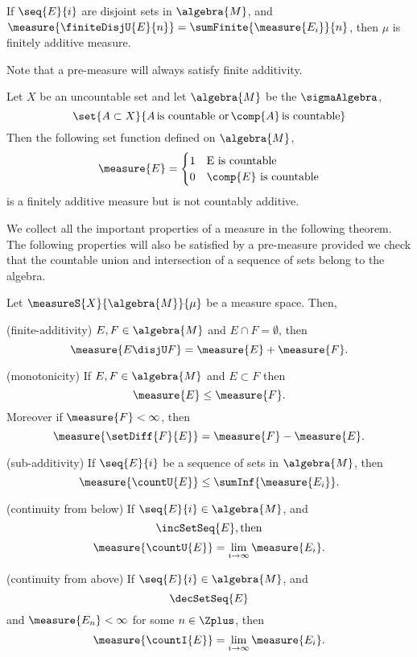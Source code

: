 \begin{Definition}[name=Finitely additive measure]
    If $\seq{E}{i}$ are disjoint sets in $\algebra{M}$, and $\measure{\finiteDisjU{E}{n}} =
    \sumFinite{\measure{E_i}}{n}$, then $\mu$ is finitely additive measure.
\end{Definition}
Note that a pre-measure will always satisfy finite additivity.
\begin{Example}
    Let $X$ be an uncountable set and let $\algebra{M}$ be the $\sigmaAlgebra$,
    \begin{equation*}
	\set{A \subset X}{A \, \text{is countable or} \,
	    \comp{A}\,\text{is countable}}
    \end{equation*}
    Then the following set function defined on $\algebra{M}$,
    \begin{equation*}
	\measure{E} =
	\begin{cases}
	    1 &\text{E is countable}\\
	    0 &\text{$\comp{E}$ is countable}
	\end{cases}
    \end{equation*}
    is a finitely additive measure but is not countably additive.
\end{Example}
We collect all the important properties of a measure in the following theorem. The following
properties will also be satisfied by a pre-measure provided we check that the countable union and
intersection of a sequence of sets belong to the algebra.
\begin{Theorem}[name=Properties of measure]\label{thm:prop_of_meas}
    Let $\measureS{X}{\algebra{M}}{\mu}$ be a measure space. Then,
    \begin{properties}
	\item 
	    (finite-additivity) $E,F \in \algebra{M}$ and $E \cap F = \emptyset$, then 
	    \[\measure{E\disjU F} = \measure{E} + \measure{F}.\]
	\item
	    (monotonicity) If $E,F \in \algebra{M}$ and $E \subset F$ then 
	    \[\measure{E} \leq \measure{F}.\]
	    Moreover if $\measure{F} < \infty$, then 
	    \[\measure{\setDiff{F}{E}} = \measure{F} - \measure{E}.\]
	\item
	    (sub-additivity) If $\seq{E}{i}$ be a sequence of sets in $\algebra{M}$, 
	    then \[\measure{\countU{E}} \leq \sumInf{\measure{E_i}}.\]
	\item
	    (continuity from below) If $\seq{E}{i} \in \algebra{M}$, and \[\incSetSeq{E},\text{then}\]
	    \[\measure{\countU{E}} = \lim\limits_{i\to\infty}\measure{E_i}.\]
	\item
	    (continuity from above) If $\seq{E}{i} \in \algebra{M}$, 
	    and \[\decSetSeq{E}\] and $\measure{E_n} < \infty$ for some $n \in \Zplus$, 
	    then \[\measure{\countI{E}} =
	    \lim\limits_{i\to\infty}\measure{E_i}.\]
    \end{properties}
\end{Theorem}
